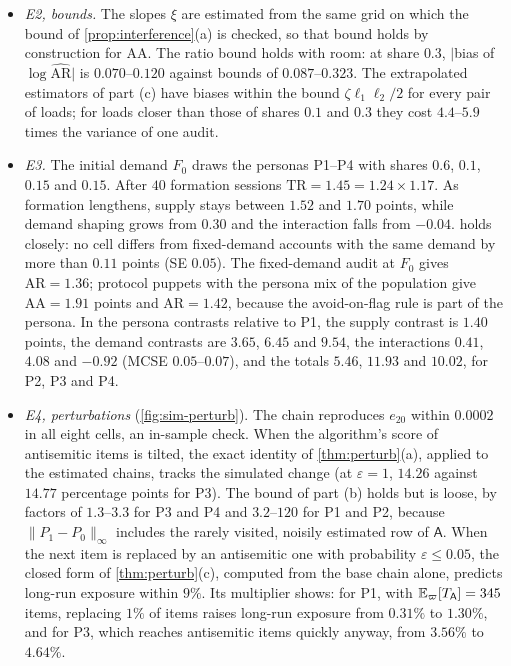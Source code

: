\begin{itemize}
  \item \emph{E2, bounds.} The slopes $\xi$ are estimated from the same grid on which the bound of \cref{prop:interference}(a) is checked, so that bound holds by construction for $\mathrm{AA}$. The ratio bound holds with room: at share $0.3$, $|$bias of $\log\widehat{\mathrm{AR}}|$ is $0.070$--$0.120$ against bounds of $0.087$--$0.323$. The extrapolated estimators of part (c) have biases within the bound $\zeta\ell_1\ell_2/2$ for every pair of loads; for loads closer than those of shares $0.1$ and $0.3$ they cost $4.4$--$5.9$ times the variance of one audit.
  \item \emph{E3.} The initial demand $F_0$ draws the personas P1--P4 with shares $0.6$, $0.1$, $0.15$ and $0.15$. After $40$ formation sessions $\mathrm{TR}=1.45=1.24\times1.17$. As formation lengthens, supply stays between $1.52$ and $1.70$ points, while demand shaping grows from $0.30$ and the interaction falls from $-0.04$.  holds closely: no cell differs from fixed-demand accounts with the same demand by more than $0.11$ points (SE $0.05$). The fixed-demand audit at $F_0$ gives $\mathrm{AR}=1.36$; protocol puppets with the persona mix of the population give $\mathrm{AA}=1.91$ points and $\mathrm{AR}=1.42$, because the avoid-on-flag rule is part of the persona. In the persona contrasts relative to P1, the supply contrast is $1.40$ points, the demand contrasts are $3.65$, $6.45$ and $9.54$, the interactions $0.41$, $4.08$ and $-0.92$ (MCSE $0.05$--$0.07$), and the totals $5.46$, $11.93$ and $10.02$, for P2, P3 and P4.
  \item \emph{E4, perturbations} (\cref{fig:sim-perturb}). The chain reproduces $e_{20}$ within $0.0002$ in all eight cells, an in-sample check. When the algorithm's score of antisemitic items is tilted, the exact identity of \cref{thm:perturb}(a), applied to the estimated chains, tracks the simulated change (at $\varepsilon=1$, $14.26$ against $14.77$ percentage points for P3). The bound of part (b) holds but is loose, by factors of $1.3$--$3.3$ for P3 and P4 and $3.2$--$120$ for P1 and P2, because $\|P_1-P_0\|_\infty$ includes the rarely visited, noisily estimated row of $\mathsf A$. When the next item is replaced by an antisemitic one with probability $\varepsilon\le0.05$, the closed form of \cref{thm:perturb}(c), computed from the base chain alone, predicts long-run exposure within $9\%$. Its multiplier shows: for P1, with $\mathbb{E}_\varpi[T_{\mathsf A}]=345$ items, replacing $1\%$ of items raises long-run exposure from $0.31\%$ to $1.30\%$, and for P3, which reaches antisemitic items quickly anyway, from $3.56\%$ to $4.64\%$.

\end{itemize}

